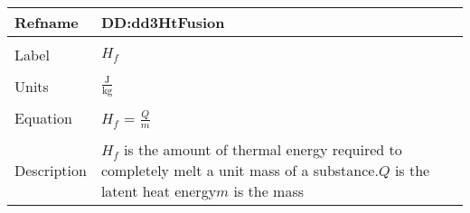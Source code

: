 \documentclass[12pt]{article}
\begin{document}
~\newline
\noindent \begin{minipage}{\textwidth}
\begin{tabular}{p{} p{}}
\toprule \textbf{Refname} & \textbf{DD:dd3HtFusion}
\label{DD:dd3HtFusion}
\\ \midrule \\
Label & $H_{f}$
\\ \midrule \\
Units & $\frac{\text{J}}{\text{kg}}$
\\ \midrule \\
Equation & $H_{f}$ = $\frac{Q}{m}$
\\ \midrule \\
Description & $H_{f}$ is the amount of thermal energy required to completely melt a unit mass of a substance.\newline$Q$ is the latent heat energy\newline$m$ is the mass
\\ \bottomrule \end{tabular}
\end{minipage}\\
\end{document}

